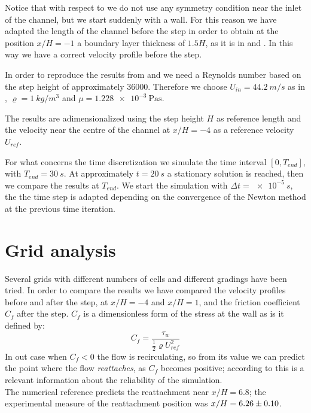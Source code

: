 \documentclass[11pt, a4paper]{article}
\theoremstyle{definition}
\begin{document}
Notice that with respect to \cite{sitonasa} we do not use any symmetry 
condition near the inlet of the channel, but we start suddenly with a wall. For 
this reason we have adapted the length of the channel before the step in order 
to obtain at the position $x/H = -1$ a boundary layer thickness of $1.5H$, as 
it 
is in \cite{driver} and \cite{sitonasa}. In this way we have a correct velocity 
profile before the step.

In order to reproduce the results from \cite{driver} and \cite{sitonasa} we 
need 
a Reynolds number based on the step height of approximately 36000. Therefore we 
choose 
$U_{in} 
= \SI{44.2}{m/s}$ as in \cite{driver}, $\varrho = \SI{1}{kg/m^3}$ and $\mu 
= \SI{1.228e-3}{\pascal\second}$.

The results are adimensionalized using the step height $H$ as reference length 
and the velocity near the centre of the channel at $x/H = -4$ as a reference 
velocity $U_{ref}$.

For what concerns the time discretization we simulate the time interval $[0, 
T_{end}]$, with $T_{end} = \SI{30}{s}$. At approximately $t = \SI{20}{s}$ a 
stationary solution is reached, then we compare the results at $T_{end}$. We 
start the simulation with $\Delta t = \SI{e-5}{s}$, the the time 
step is adapted depending on the convergence of the Newton method at the 
previous time iteration.

\section{Grid analysis}
Several grids with different numbers of cells and different gradings have been 
tried. In order to compare the results we have compared the velocity profiles 
before and after the step, at $x/H = -4$ and $x/H = 1$, and the friction 
coefficient $C_f$ after the step. $C_f$ is a dimensionless form of the stress 
at the wall as is it defined by:
\begin{equation*}
C_f = \frac{\tau_w}{\frac{1}{2}\varrho U_{ref}^2}
\end{equation*}
In out case when $C_f < 0$ the flow is recirculating, so from its value we can 
predict the point where the flow \emph{reattaches}, as $C_f$ becomes positive; 
according to \cite{sitonasa} this is a relevant information about the 
reliability of the simulation.\\
The numerical reference predicts the reattachment near $x/H=6.8$; the 
experimental measure of the reattachment position was $x/H = \num{6.26+-0.10}$.
\end{document}
